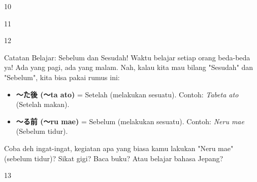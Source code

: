 \begin{convobox}{10}
    \noindent
     

    \vspace{1.5em}
\end{convobox}

\begin{convobox}{11}
    \noindent
      
     

    \vspace{1.5em}
\end{convobox}

\begin{convobox}{12}
    \noindent
      
      

    \vspace{1.5em}
\end{convobox}

\begin{lessonbox}{Catatan Belajar: Sebelum dan Sesudah!}
    Waktu belajar setiap orang beda-beda ya! Ada yang pagi, ada yang malam. Nah, kalau kita mau bilang "Sesudah" dan "Sebelum", kita bisa pakai rumus ini:
    \begin{itemize}
        \item \textbf{〜た後 (〜ta ato)} = Setelah (melakukan sesuatu). Contoh: \textit{Tabeta ato} (Setelah makan).
        \item \textbf{〜る前 (〜ru mae)} = Sebelum (melakukan sesuatu). Contoh: \textit{Neru mae} (Sebelum tidur).
    \end{itemize}
    Coba deh ingat-ingat, kegiatan apa yang biasa kamu lakukan "Neru mae" (sebelum tidur)? Sikat gigi? Baca buku? Atau belajar bahasa Jepang?
\end{lessonbox}

\begin{convobox}{13}
    \noindent
       
      
      

    \vspace{1.5em}
\end{convobox}

